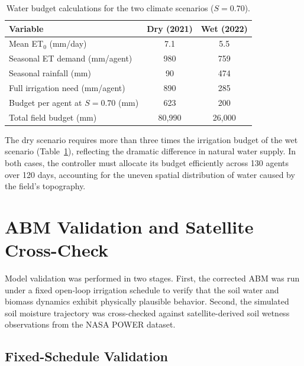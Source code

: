 \begin{table}[htbp]
\centering
\caption{Water budget calculations for the two climate scenarios ($S = 0.70$).}
\label{tab:budget}
\begin{tabular}{lcc}
\toprule
\textbf{Variable} & \textbf{Dry (2021)} & \textbf{Wet (2022)} \\
\midrule
Mean ET$_0$ (mm/day)                  & 7.1   & 5.5   \\
Seasonal ET demand (mm/agent)         & 980   & 759   \\
Seasonal rainfall (mm)                & 90    & 474   \\
Full irrigation need (mm/agent)       & 890   & 285   \\
Budget per agent at $S=0.70$ (mm)     & 623   & 200   \\
Total field budget (mm)               & 80,990 & 26,000 \\
\bottomrule
\end{tabular}
\end{table}

The dry scenario requires more than three times the irrigation budget of the wet scenario (Table~\ref{tab:budget}), reflecting the dramatic difference in natural water supply. In both cases, the controller must allocate its budget efficiently across 130 agents over 120 days, accounting for the uneven spatial distribution of water caused by the field's topography.


\section{ABM Validation and Satellite Cross-Check}
\label{sec:validation}

Model validation was performed in two stages. First, the corrected ABM was run under a fixed open-loop irrigation schedule to verify that the soil water and biomass dynamics exhibit physically plausible behavior. Second, the simulated soil moisture trajectory was cross-checked against satellite-derived soil wetness observations from the NASA POWER dataset.


\subsection{Fixed-Schedule Validation}
\label{sec:fixed_validation}

